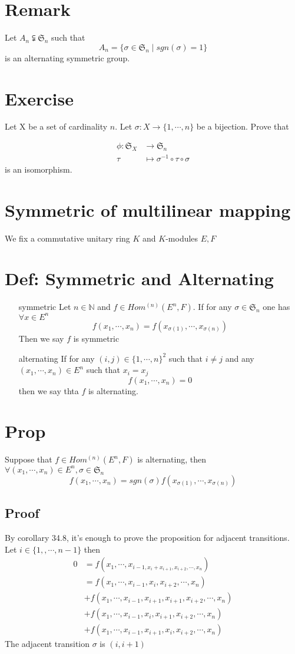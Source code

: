 \documentclass{book}
\begin{document}
\section{Remark}
Let $A_n\subsetneqq\mathfrak{S}_n$ such that 
$$A_n=\{\sigma\in \mathfrak{S}_n\mid sgn(\sigma)=1\}$$
is an alternating symmetric group.
\section{Exercise}
Let X be a set of cardinality $n$. Let $\sigma:X\rightarrow\{1,\cdots,n\}$ be a bijection. Prove that 

$$
\begin{aligned}
    \phi:\mathfrak{S}_X &\rightarrow \mathfrak{S}_n\\
    \tau &\mapsto \sigma^{-1}\circ\tau\circ\sigma
\end{aligned}
$$ is an isomorphism.
\section{Symmetric of multilinear mapping}
We fix a commutative unitary ring $K$ and $K$-modules $E,F$
\section{Def: Symmetric and Alternating}
\begin{itemize}
    \item [symmetric]Let $n\in \mathbb{N}$ and $f\in Hom^{(n)}(E^n,F)$. If for any $\sigma\in \mathfrak{S}_n$ one has $\forall x\in E^n$$$f(x_1,\cdots,x_n)=f(x_{\sigma(1)},\cdots,x_{\sigma(n)})$$
    Then we say $f$ is symmetric
    \item [alternating]If for any $(i,j)\in \{1,\cdots,n\}^2$ such that $i\neq j$ and any $(x_1,\cdots,x_n)\in E^n$ such that $x_i=x_j$$$f(x_1,\cdots,x_n)=0$$ then we say thta $f$ is alternating.
\end{itemize}
\section{Prop}
Suppose that $f\in Hom^{(n)}(E^n,F)$ is alternating, then $\forall(x_1,\cdots,x_n)\in E^n,\sigma\in \mathfrak{S}_n$
$$f(x_1,\cdots,x_n)=sgn(\sigma)f(x_{\sigma(1)},\cdots,x_{\sigma(n)})$$
\subsection*{Proof}
By corollary 34.8, it's enough to prove the proposition for adjacent transitions. Let $i\in \{1,,\cdots,n-1\}$ then $$
\begin{aligned}
    0 &=f(x_1,\cdots,x_{i-1,x_i+x_{i+1},x_{i+2},\cdots,x_n})\\
    &=f(x_1,\cdots,x_{i-1},x_i,x_{i+2},\cdots,x_n)\\ &+f(x_1,\cdots,x_{i-1},x_{i+1},x_{i+1},x_{i+2},\cdots,x_n)\\
    &+f(x_1,\cdots,x_{i-1},x_i,x_{i+1},x_{i+2},\cdots,x_n)\\
    &+f(x_1,\cdots,x_{i-1},x_{i+1},x_i,x_{i+2},\cdots,x_n)
\end{aligned}$$
The adjacent transition $\sigma$ is $(i,i+1)$
\end{document}
